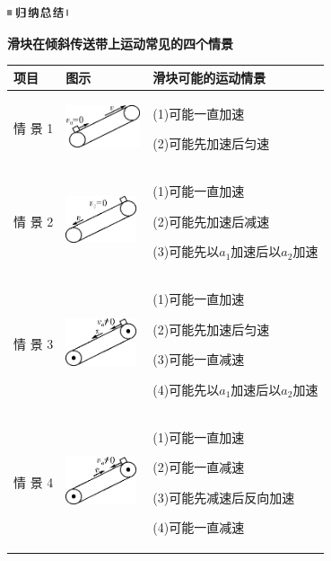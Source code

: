 \documentclass[cn,10.5pt,chinese,mac,chinesefont=founder]{elegantbook}
\begin{document}
\begin{center}\includegraphics[width=0.70833in,height=0.125in]{media/image13.png}

\textbf{滑块在倾斜传送带上运动常见的四个情景}
\end{center}


\begin{longtable}[]{@{}m{1cm}m{2.5cm}m{5cm}@{}}
\toprule
项目 & 图示 & 滑块可能的运动情景\tabularnewline
\midrule
\endhead

情
景
1
&
\includegraphics[width=0.86458in,height=0.48958in]{media/image127.png}
&
(1)可能一直加速

(2)可能先加速后匀速
\tabularnewline

情
景
2
&
\includegraphics[width=0.82292in,height=0.54167in]{media/image128.png}
&
(1)可能一直加速

(2)可能先加速后减速

(3)可能先以$a_1$加速后以$a_2$加速
\tabularnewline

情
景
3
&
\includegraphics[width=0.82292in,height=0.55208in]{media/image129.png}
&
(1)可能一直加速

(2)可能先加速后匀速

(3)可能一直减速

(4)可能先以$a_1$加速后以$a_2$加速
\tabularnewline

情
景
4
&
\includegraphics[width=0.82292in,height=0.55208in]{media/image130.png}
&
(1)可能一直加速

(2)可能一直减速

(3)可能先减速后反向加速

(4)可能一直减速
\tabularnewline
\bottomrule
\end{longtable}
\newpage
\end{document}
